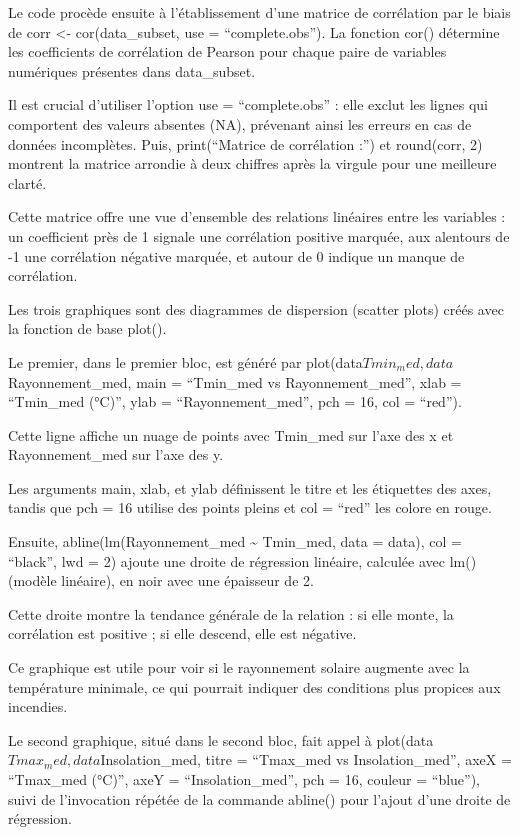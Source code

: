 \documentclass[
]{article}
\begin{document}
Le code procède ensuite à l'établissement d'une matrice de corrélation
par le biais de corr \textless- cor(data\_subset, use =
``complete.obs''). La fonction cor() détermine les coefficients de
corrélation de Pearson pour chaque paire de variables numériques
présentes dans data\_subset.

Il est crucial d'utiliser l'option use = ``complete.obs'' : elle exclut
les lignes qui comportent des valeurs absentes (NA), prévenant ainsi les
erreurs en cas de données incomplètes. Puis, print(``Matrice de
corrélation :'') et round(corr, 2) montrent la matrice arrondie à deux
chiffres après la virgule pour une meilleure clarté.

Cette matrice offre une vue d'ensemble des relations linéaires entre les
variables : un coefficient près de 1 signale une corrélation positive
marquée, aux alentours de -1 une corrélation négative marquée, et autour
de 0 indique un manque de corrélation.

Les trois graphiques sont des diagrammes de dispersion (scatter plots)
créés avec la fonction de base plot().

Le premier, dans le premier bloc, est généré par
plot(data\(Tmin_med, data\)Rayonnement\_med, main = ``Tmin\_med vs
Rayonnement\_med'', xlab = ``Tmin\_med (°C)'', ylab =
``Rayonnement\_med'', pch = 16, col = ``red'').

Cette ligne affiche un nuage de points avec Tmin\_med sur l'axe des x et
Rayonnement\_med sur l'axe des y.

Les arguments main, xlab, et ylab définissent le titre et les étiquettes
des axes, tandis que pch = 16 utilise des points pleins et col = ``red''
les colore en rouge.

Ensuite, abline(lm(Rayonnement\_med \textasciitilde{} Tmin\_med, data =
data), col = ``black'', lwd = 2) ajoute une droite de régression
linéaire, calculée avec lm() (modèle linéaire), en noir avec une
épaisseur de 2.

Cette droite montre la tendance générale de la relation : si elle monte,
la corrélation est positive ; si elle descend, elle est négative.

Ce graphique est utile pour voir si le rayonnement solaire augmente avec
la température minimale, ce qui pourrait indiquer des conditions plus
propices aux incendies.

Le second graphique, situé dans le second bloc, fait appel à
plot(data\(Tmax_med, data\)Insolation\_med, titre = ``Tmax\_med vs
Insolation\_med'', axeX = ``Tmax\_med (°C)'', axeY =
``Insolation\_med'', pch = 16, couleur = ``blue''), suivi de
l'invocation répétée de la commande abline() pour l'ajout d'une droite
de régression.
\end{document}
